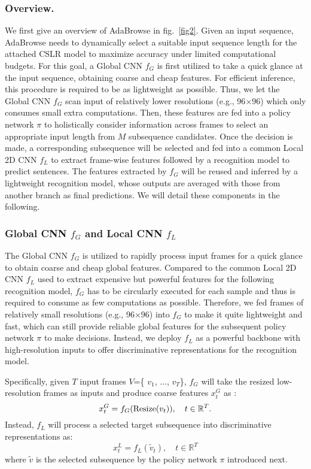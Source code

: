 \documentclass[sigconf]{acmart}
\begin{document}
\subsubsection{Overview.} We first give an overview of AdaBrowse in fig.~\ref{fig2}. Given an input sequence, AdaBrowse needs to dynamically select a suitable input sequence length for the attached CSLR model to maximize accuracy under limited computational budgets. For this goal, a Global CNN $f_G$ is first utilized to take a quick glance at the input sequence, obtaining coarse and cheap features. For efficient inference, this procedure is required to be as lightweight as possible. Thus, we let the Global CNN $f_G$ scan input of relatively lower resolutions (e.g., 96$\times$96) which only consumes small extra computations. Then, these features are fed into a policy network $\pi$ to holistically consider information across frames to select an appropriate input length from $M$ subsequence candidates. Once the decision is made, a corresponding subsequence will be selected and fed into a common Local 2D CNN $f_L$ to extract frame-wise features followed by a recognition model to predict sentences. The features extracted by $f_G$ will be reused and inferred by a lightweight recognition model, whose outputs are averaged with those from another branch as final predictions. We will detail these components in the following.
\subsubsection{Global CNN $f_G$ and Local CNN $f_L$}
The Global CNN $f_G$ is utilized to rapidly process input frames for a quick glance to obtain coarse and cheap global features. Compared to the common Local 2D CNN $f_L$ used to extract expensive but powerful features for the following recognition model, $f_G$ has to be circularly executed for each sample and thus is required to consume as few computations as possible. Therefore, we fed frames of relatively small resolutions (e.g., 96$\times$96) into $f_G$ to make it quite lightweight and fast, which can still provide reliable global features for the subsequent policy network $\pi$ to make decisions. Instead, we deploy $f_L$ as a powerful backbone with high-resolution inputs to offer discriminative representations for the recognition model. 
  
Specifically, given $T$ input frames $V$=\{ $v_1$, $\dots$, $v_T$\}, $f_G$ will take the resized low-resolution frames as inputs and produce coarse features $x_t^G$ as :
  \begin{equation}
    \label{e1}
      x_t^G = f_G({\rm Resize}(v_t)),\quad t\in\mathbb{R}^{T}.
    \end{equation} 
Instead, $f_L$ will process a selected target subsequence into discriminative representations as:
  \begin{equation}
    \label{e2}
      x_{t}^L = f_L(\widetilde{v}_{t}),\quad t\in\mathbb{R}^{T}
    \end{equation} 
where $\widetilde{v}$ is the selected subsequence by the policy network $\pi$ introduced next.
  
\end{document}
